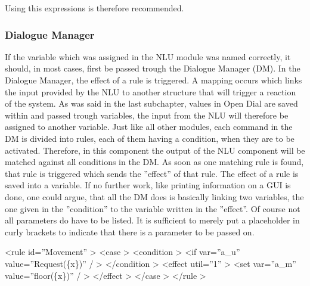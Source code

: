 \documentclass[a4paper, 12pt]{article}
\begin{document}
   Using this expressions is therefore recommended.

   \subsubsection{Dialogue Manager}

   If the variable which was assigned in the NLU module was named correctly, it should, in most cases, first be passed trough the Dialogue Manager (DM).
   In the Dialogue Manager, the effect of a rule is triggered. A mapping occurs which links the input provided by the NLU to another structure that will trigger a reaction of the system.
   As was said in the last subchapter, values in Open Dial are saved within and passed trough variables, the input from the NLU will therefore be assigned to another variable. \newline
   Just like all other modules, each command in the DM is divided into rules, each of them having a condition, when they are to be activated. 
   Therefore, in this component the output of the NLU component will be matched against all conditions in the DM. 
   As soon as one matching rule is found, that rule is triggered which sends the ”effect” of that rule.
   The effect of a rule is saved into a variable.
   If no further work, like printing information on a GUI is done, one could argue, that all the DM does is basically linking two variables, the one given in the ”condition” to the variable written in the ”effect”.
   Of course not all parameters do have to be listed.
   It is sufficient to merely put a placeholder in curly brackets to indicate that there is a parameter to be passed on. \newline


   \textless rule id=”Movement” \textgreater \newline
    \indent \indent \textless case \textgreater \newline
    \indent \indent \indent \textless condition \textgreater \newline
    \indent \indent \indent \indent \textless if var=”a\_u” value=”Request(\{x\})” / \textgreater \newline
     \indent \indent \indent \textless /condition \textgreater \newline
      \indent \indent \indent \textless effect util=”1” \textgreater \newline 
       \indent \indent \indent \indent \textless set var=”a\_m” value=”floor(\{x\})” / \textgreater \newline
        \indent \indent \indent \textless /effect \textgreater \newline
        \indent \indent \textless /case \textgreater \newline
        \indent \textless /rule \textgreater \newline
\end{document}
